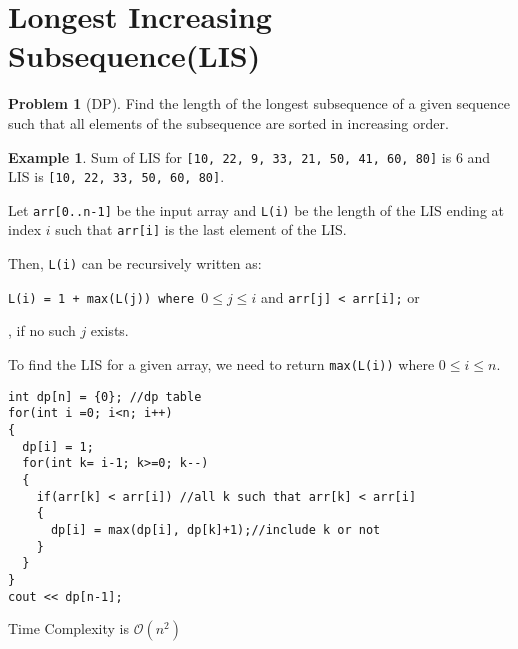 \documentclass[twoside,12pt,a4paper,english]{book}
\theoremstyle{definition}
\newtheorem*{exmp}{Example}
\theoremstyle{problemstyle}
\newtheorem*{problem}{Problem} %
\theoremstyle{problemstyle}
\theoremstyle{problemstyle}
\begin{document}
\section{Longest Increasing Subsequence(LIS)}
\begin{problem}[DP]
Find the length of the longest subsequence of a given sequence such that all elements of the subsequence are sorted in increasing order.
\end{problem}
\begin{exmp}
Sum of LIS for \texttt{[10, 22, 9, 33, 21, 50, 41, 60, 80]} is $6$ and LIS is \texttt{[10, 22, 33, 50, 60, 80]}.
\end{exmp}
\begin{tcolorbox}[title=Solution]

Let \texttt{arr[0..n-1]} be the input array and \texttt{L(i)} be the length of the LIS ending at index $i$ such that \texttt{arr[i]} is the last element of the LIS.

Then, \texttt{L(i)} can be recursively written as:

\texttt{L(i) = 1 + max(L(j)) where }$0 \leq j \leq i$ and \texttt{arr[j] < arr[i];} or

, if no such $j$ exists.

To find the LIS for a given array, we need to return \texttt{max(L(i))} where $0 \leq i \leq n$.
\begin{lstlisting}
int dp[n] = {0}; //dp table
for(int i =0; i<n; i++)
{
  dp[i] = 1;
  for(int k= i-1; k>=0; k--)
  {
    if(arr[k] < arr[i]) //all k such that arr[k] < arr[i]
    {
      dp[i] = max(dp[i], dp[k]+1);//include k or not
    }
  }
}
cout << dp[n-1];
\end{lstlisting}

Time Complexity is $\mathcal{O}(n^2)$
\end{tcolorbox}
\newpage
\end{document}
